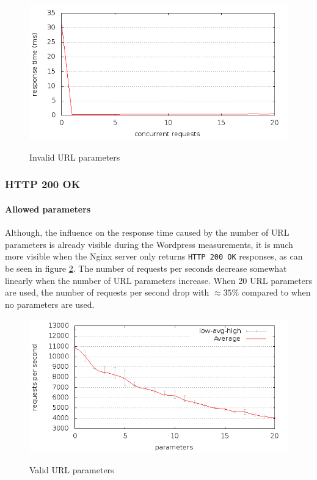\documentclass[Experiments]{subfiles}
\begin{document}
\begin{figure}[H]
\caption{Invalid URL parameters}
\centering
\includegraphics[scale=0.55] {images/results/wp_with_naxsi_incremented_disallowed_parameters/output.png}
\label{fig:Invalid parameters}
\end{figure}

\subsubsection{HTTP 200 OK}

\paragraph{Allowed parameters}
Although, the influence on the response time caused by the number of \ac{URL} parameters is already visible during the Wordpress measurements, it is much more visible when the Nginx server only returns  \verb+HTTP 200 OK+ responses, as can be seen in figure \ref{fig:HTTP 200 OK: valid url parameters}. The number of requests per seconds decrease somewhat linearly when the number of \ac{URL} parameters increase. When 20 \ac{URL} parameters are used, the number of requests per second drop with $\approx 35\%$ compared to when no parameters are used.

\begin{figure}[H]
\caption{Valid URL parameters}
\centering
\includegraphics[scale=0.55] {images/results/200_with_naxsi_incremented_allowed_parameters/output.png}
\label{fig:HTTP 200 OK: valid url parameters}
\end{figure}
\end{document}
